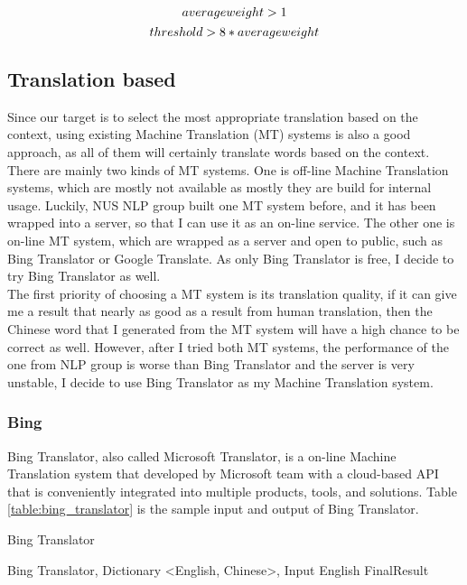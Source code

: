 \documentclass[11pt]{article}
\begin{document}
\begin{equation}
averageweight > 1\\
\label{equation:category_1}
\end{equation}
\begin{equation}
threshold > 8 * averageweight\\
\label{equation:category_2}
\end{equation}

\subsection{Translation based}
Since our target is to select the most appropriate translation based on the context, using existing Machine Translation (MT) systems is also a good approach, as all of them will certainly translate words based on the context.
\\
There are mainly two kinds of MT systems. One is off-line Machine Translation systems, which are mostly not available as mostly they are build for internal usage. Luckily, NUS NLP group built one MT system before, and it has been wrapped into a server, so that I can use it as an on-line service. The other one is on-line MT system, which are wrapped as a server and open to public, such as Bing Translator or Google Translate. As only Bing Translator is free, I decide to try Bing Translator as well.
\\
The first priority of choosing a MT system is its translation quality, if it can give me a result that nearly as good as a result from human translation, then the Chinese word that I generated from the MT system will have a high chance to be correct as well. However, after I tried both MT systems, the performance of the one from NLP group is worse than Bing Translator and the server is very unstable, I decide to use Bing Translator as my Machine Translation system.
\\
\subsubsection{Bing}
Bing Translator, also called Microsoft Translator, is a on-line Machine Translation system that developed by Microsoft team with a cloud-based API that is conveniently integrated into multiple products, tools, and solutions. Table \ref{table:bing_translator} is the sample input and output of Bing Translator.
\\
\begin{algorithm}[ht]
\caption{Bing Translator}
\label{algorithm:wsd_3}
\begin{algorithmic}
\REQUIRE Bing Translator, Dictionary \textless English, Chinese\textgreater, Input English
        \ENDIF
    \ENDFOR
\ENDIF
\RETURN FinalResult
\end{algorithmic}
\end{algorithm}
\end{document}
